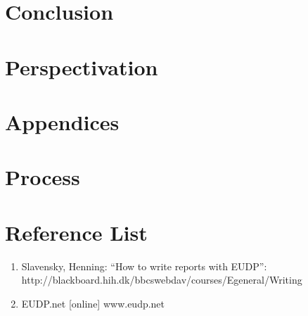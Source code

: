 

















\chapter{Conclusion}

\chapter{Perspectivation}

\chapter{Appendices}

\chapter{Process}

\chapter{Reference List}

\begin{enumerate}

\item Slavensky, Henning: “How to write reports with EUDP”:
http://blackboard.hih.dk/bbcswebdav/courses/Egeneral/Writing%

\item EUDP.net [online] 
www.eudp.net
\end{enumerate}
